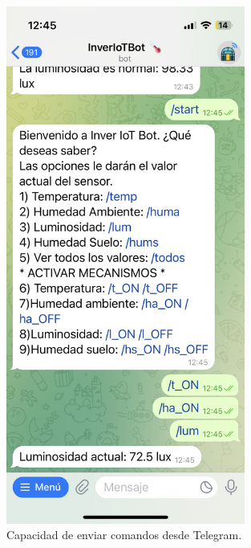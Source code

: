 \begin{figure}[h]
\centering
\includegraphics[width=0.7\textwidth]{img/desarrollo/BotTelegram_comandos.png}
\caption{Capacidad de enviar comandos desde Telegram.}
\end{figure}

